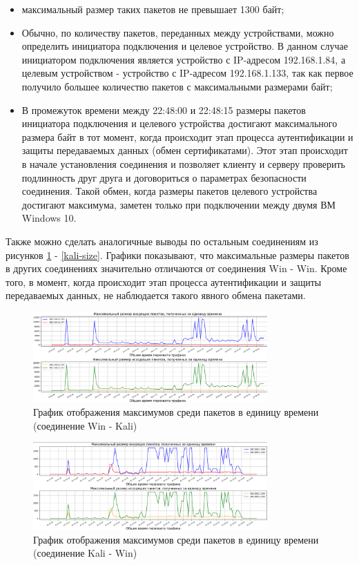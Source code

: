 \documentclass[bachelor, och, coursework]{SCWorks}
\begin{document}
\begin{itemize}
  \item максимальный размер таких пакетов не превышает 1300 байт; 
  \item Обычно, по количеству пакетов, переданных между устройствами, можно определить инициатора подключения и целевое 
  устройство. В данном случае инициатором подключения является устройство с IP-адресом 192.168.1.84, а целевым устройством - 
  устройство с IP-адресом 192.168.1.133, так как первое получило большее количество пакетов с максимальными размерами байт;
  \item В промежуток времени между 22:48:00 и 22:48:15 размеры пакетов инициатора подключения и целевого устройства достигают 
  максимального размера байт в тот момент, когда происходит этап процесса аутентификации и защиты передаваемых данных (обмен сертификатами). 
  Этот этап происходит в начале установления соединения и позволяет клиенту и серверу проверить 
  подлинность друг друга и договориться о параметрах безопасности соединения.
  Такой обмен, когда размеры пакетов целевого устройства достигают максимума, заметен только при 
  подключении между двумя ВМ Windows 10.
\end{itemize}

Также можно сделать аналогичные выводы по остальным соединениям из рисунков \ref{winkal-size} - \ref{kali-size}. 
Графики показывают, что максимальные размеры пакетов в других соединениях значительно отличаются от соединения 
Win - Win. Кроме того, в момент, когда происходит этап процесса аутентификации и защиты передаваемых данных, 
не наблюдается такого явного обмена пакетами.


\begin{figure}[H]
  \centering
  \includegraphics[width=0.8\textwidth]{photo/size-winkal.png}
  \caption{График отображения максимумов среди пакетов в единицу времени (соединение Win - Kali)}
  \label{winkal-size}
\end{figure}


\begin{figure}[H]
  \centering
  \includegraphics[width=0.8\textwidth]{photo/size-kalwin.png}
  \caption{График отображения максимумов среди пакетов в единицу времени (соединение Kali - Win)}
  \label{kalwin-size}
\end{figure}
\end{document}
